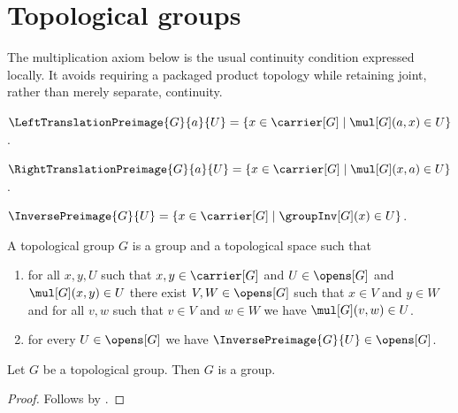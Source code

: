


\section{Topological groups}

The multiplication axiom below is the usual continuity condition expressed
locally.  It avoids requiring a packaged product topology while retaining
joint, rather than merely separate, continuity.

\begin{definition}\label{left_translation_preimage}
    $\LeftTranslationPreimage{G}{a}{U}=
        \{x\in\carrier[G]\mid\mul[G](a,x)\in U\}$.
\end{definition}

\begin{definition}\label{right_translation_preimage}
    $\RightTranslationPreimage{G}{a}{U}=
        \{x\in\carrier[G]\mid\mul[G](x,a)\in U\}$.
\end{definition}

\begin{definition}\label{inverse_preimage}
    $\InversePreimage{G}{U}=
        \{x\in\carrier[G]\mid\groupInv[G](x)\in U\}$.
\end{definition}

\begin{struct}\label{topological_group}
    A topological group $G$ is a group and a topological space such that
    \begin{enumerate}
        \item\label{topological_group_multiplication}
            for all $x,y,U$ such that $x,y\in\carrier[G]$ and
                $U\in\opens[G]$ and $\mul[G](x,y)\in U$ there exist
                $V,W\in\opens[G]$ such that $x\in V$ and $y\in W$ and
                for all $v,w$ such that $v\in V$ and $w\in W$ we have
                    $\mul[G](v,w)\in U$.
        \item\label{topological_group_inverse}
            for every $U\in\opens[G]$ we have
                $\InversePreimage{G}{U}\in\opens[G]$.
    \end{enumerate}
\end{struct}

\begin{corollary}\label{topological_group_is_group}
    Let $G$ be a topological group.
    Then $G$ is a group.
\end{corollary}
\begin{proof}
    Follows by .
\end{proof}

